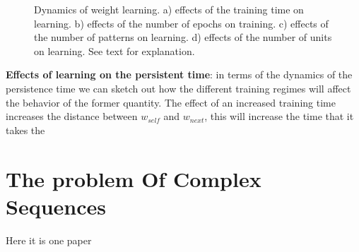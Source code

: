 \documentclass[10pt,a4paper]{article}
\begin{document}
\begin{figure}[H]%
    \centering
    \qquad
    \hfill
     \qquad
    \caption{Dynamics of weight learning. a) effects of the training time on learning. b) effects of the number of epochs on training. c) effects of the number of patterns on learning. d) effects of the number of units on learning. See text for explanation.}
    \label{fig:simple_bcpnn_learning}%
\end{figure}



\textbf{Effects of learning on the persistent time}: in terms of the dynamics of the persistence time we can sketch out how the different training regimes will affect the behavior of the former quantity. The effect of an increased training time increases the distance between $w_{self}$ and $w_{next}$, this will increase the time that it takes the  


\section{The problem Of Complex Sequences}
Here it is one paper \cite{guyon1988storage}



\end{document}
